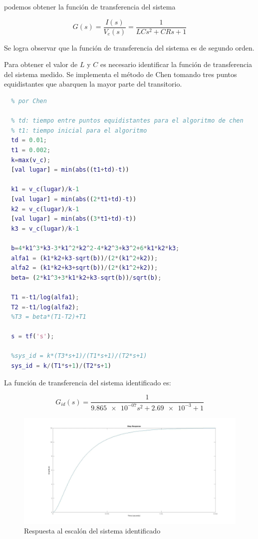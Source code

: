 \documentclass{article}
\begin{document}
podemos obtener la función de transferencia del sistema

$$G(s)=\frac{I(s)}{V_e(s)}= \frac{1}{LCs^2+CRs+1}$$

Se logra observar que la función de transferencia del sistema es de segundo orden. 

Para obtener el valor de $L$ y $C$ es necesario identificar la función de transferencia del sistema medido. Se implementa
el método de Chen tomando tres puntos equidistantes que abarquen la mayor parte del transitorio.

\begin{lstlisting}[language=matlab]
  % Determinamos el modelo del circuito RLC a partir del metodo desarrollado
  % por Chen
  
  % td: tiempo entre puntos equidistantes para el algoritmo de chen
  % t1: tiempo inicial para el algoritmo
  td = 0.01;
  t1 = 0.002;
  k=max(v_c);
  [val lugar] = min(abs((t1+td)-t))
  
  k1 = v_c(lugar)/k-1
  [val lugar] = min(abs((2*t1+td)-t))
  k2 = v_c(lugar)/k-1
  [val lugar] = min(abs((3*t1+td)-t))
  k3 = v_c(lugar)/k-1
  
  b=4*k1^3*k3-3*k1^2*k2^2-4*k2^3+k3^2+6*k1*k2*k3;
  alfa1 = (k1*k2+k3-sqrt(b))/(2*(k1^2+k2));
  alfa2 = (k1*k2+k3+sqrt(b))/(2*(k1^2+k2));
  beta= (2*k1^3+3*k1*k2+k3-sqrt(b))/sqrt(b);
  
  T1 =-t1/log(alfa1);
  T2 =-t1/log(alfa2);
  %T3 = beta*(T1-T2)+T1
  
  s = tf('s');
  
  %sys_id = k*(T3*s+1)/(T1*s+1)/(T2*s+1)
  sys_id = k/(T1*s+1)/(T2*s+1)
  \end{lstlisting}

  La función de transferencia del sistema identificado es:
   
  $$G_{id}(s) = \frac{1}{\num{9.865e-07}s^2+\num{2.69e-3}+1}$$



  \begin{figure}[!h]
    \centering
    \includegraphics[width=1\textwidth]{img/rlc2-2.jpg}
    \caption{Respuesta al escalón del sistema identificado}

  \end{figure}
\end{document}
